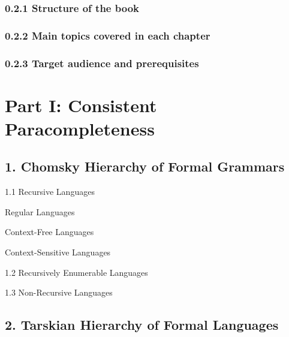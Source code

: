 \hypertarget{structure-of-the-book}{%
\subsubsection*{0.2.1 Structure of the
book}\label{structure-of-the-book}}

\hypertarget{main-topics-covered-in-each-chapter}{%
\subsubsection*{0.2.2 Main topics covered in each
chapter}\label{main-topics-covered-in-each-chapter}}

\hypertarget{target-audience-and-prerequisites}{%
\subsubsection*{0.2.3 Target audience and
prerequisites}\label{target-audience-and-prerequisites}}

\hypertarget{part-i-consistent-paracompleteness}{%
\section*{Part I: Consistent
Paracompleteness}\label{part-i-consistent-paracompleteness}}

\hypertarget{chomsky-hierarchy-of-formal-grammars}{%
\subsection*{1. Chomsky Hierarchy of Formal
Grammars}\label{chomsky-hierarchy-of-formal-grammars}}

1.1 Recursive Languages

Regular Languages

Context-Free Languages

Context-Sensitive Languages

1.2 Recursively Enumerable Languages

1.3 Non-Recursive Languages

\hypertarget{tarskian-hierarchy-of-formal-languages}{%
\subsection*{2. Tarskian Hierarchy of Formal
Languages}\label{tarskian-hierarchy-of-formal-languages}}

